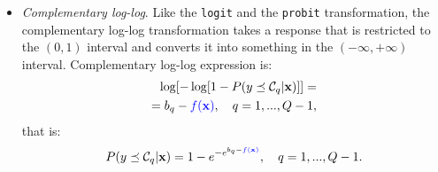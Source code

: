 \documentclass[journal]{IEEEtran}
\begin{document}
\begin{itemize}
		\item \textit{Complementary log-log}. Like the \texttt{logit} and the \texttt{probit} transformation, the complementary log-log transformation takes a response that is restricted to the $(0,1)$ interval and converts it into something in the $(-\infty, +\infty)$ interval. Complementary log-log expression is:
		\begin{equation}
		\begin{aligned}
		\log[-\log[1 - P(y \preceq \mathcal{C}_q | \mathbf{x})]] =&\\
		= b_q - \textcolor{blue}{f(\mathbf{x})}, \quad q = 1, ..., Q-1,&
		\end{aligned}
		\label{eq:cloglog}
		\end{equation}
		that is:
		\begin{equation}
		P(y \preceq \mathcal{C}_q | \mathbf{x}) = 1 - e^{-e^{b_q - \textcolor{blue}{f(\mathbf{x})}}}, \quad q = 1, ..., Q-1.
		\label{eq:cloglog2}
		\end{equation}
	\end{itemize}
	
\end{document}
